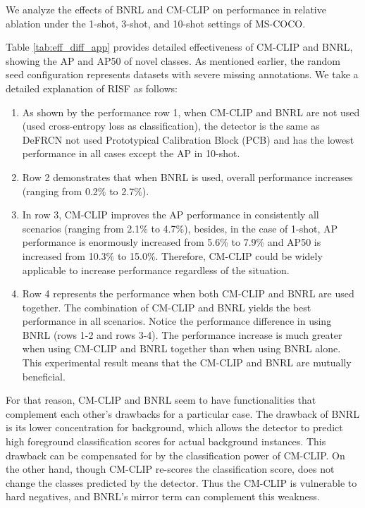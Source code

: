 \documentclass{article}
\begin{document}
We analyze the effects of BNRL and CM-CLIP on performance in relative ablation under the 1-shot, 3-shot, and 10-shot settings of MS-COCO.

Table \ref{tab:eff_diff_app} provides detailed effectiveness of CM-CLIP and BNRL, showing the AP and AP50 of novel classes.
As mentioned earlier, the random seed configuration represents datasets with severe missing annotations. We take a detailed explanation of RISF as follows:
\begin{enumerate}
    \item As shown by the performance row 1, when CM-CLIP and BNRL are not used (used cross-entropy loss as classification), the detector is the same as DeFRCN \cite{defrcn} not used Prototypical Calibration Block (PCB) and has the lowest performance in all cases except the AP in 10-shot.
    \item Row 2 demonstrates that when BNRL is used, overall performance increases (ranging from 0.2$\%$ to 2.7$\%$).
    \item In row 3, CM-CLIP improves the AP performance in consistently all scenarios (ranging from 2.1$\%$ to 4.7$\%$),
    besides, in the case of 1-shot, AP performance is enormously increased from 5.6\% to 7.9\% and AP50 is increased from 10.3\% to 15.0\%. 
    Therefore, CM-CLIP could be widely applicable to increase performance regardless of the situation.
    \item Row 4 represents the performance when both CM-CLIP and BNRL are used together. 
    The combination of CM-CLIP and BNRL yields the best performance in all scenarios. 
    Notice the performance difference in using BNRL (rows 1-2 and rows 3-4). The performance increase is much greater when using CM-CLIP and BNRL together than when using BNRL alone.
    This experimental result means that the CM-CLIP and BNRL are mutually beneficial.
\end{enumerate}

For that reason, CM-CLIP and BNRL seem to have functionalities that complement each other's drawbacks for a particular case. The drawback of BNRL is its lower concentration for background, which allows the detector to predict high foreground classification scores for actual background instances. This drawback can be compensated for by the classification power of CM-CLIP. On the other hand, though CM-CLIP re-scores the classification score, does not change the classes predicted by the detector. Thus the CM-CLIP is vulnerable to hard negatives, and BNRL's mirror term can complement this weakness. 
\end{document}
